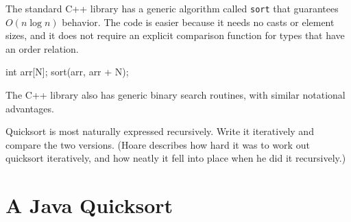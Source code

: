The standard C++ library has a generic algorithm called \verb'sort' that
guarantees $O(n\log n)$ behavior. The code is easier because it needs no
casts or element sizes, and it does not require an explicit comparison
function for types that have an order relation.
\begin{wellcode}
    int arr[N];
    sort(arr, arr + N);
\end{wellcode}
The C++ library also has generic binary search routines, with similar
notational advantages.
\begin{exercise}
Quicksort is most naturally expressed recursively. Write it iteratively and
compare the two versions. (Hoare describes how hard it was to work out
quicksort iteratively, and how neatly it fell into place when he did it
recursively.)
\end{exercise}

\section{A Java Quicksort}
\label{sec:a_java_quicksort}

